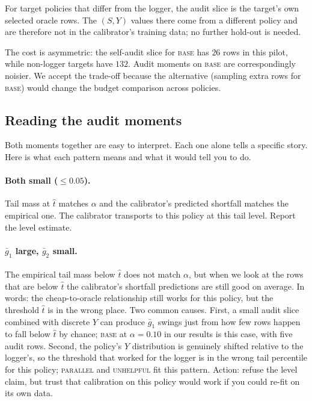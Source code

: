 \documentclass[11pt]{article}
\newcommand{\that}{\widehat{t}}
\begin{document}
For target policies that differ from the logger, the audit slice is
the target's own selected oracle rows. The $(S, Y)$ values there come
from a different policy and are therefore not in the calibrator's
training data; no further hold-out is needed.

The cost is asymmetric: the self-audit slice for \textsc{base} has
$26$ rows in this pilot, while non-logger targets have $132$. Audit
moments on \textsc{base} are correspondingly noisier. We accept the
trade-off because the alternative (sampling extra rows for
\textsc{base}) would change the budget comparison across policies.

\subsection{Reading the audit moments}
\label{app:moments-interp}

Both moments together are easy to interpret. Each one alone tells a
specific story. Here is what each pattern means and what it would tell
you to do.

\paragraph{Both small ($\le 0.05$).} Tail mass at $\that$ matches
$\alpha$ and the calibrator's predicted shortfall matches the
empirical one. The calibrator transports to this policy at this tail
level. Report the level estimate.

\paragraph{$\bar g_1$ large, $\bar g_2$ small.}
The empirical tail mass below $\that$ does not match $\alpha$, but
when we look at the rows that are below $\that$ the calibrator's
shortfall predictions are still good on average. In words: the
cheap-to-oracle relationship still works for this policy, but the
threshold $\that$ is in the wrong place. Two common causes. First, a
small audit slice combined with discrete $Y$ can produce $\bar g_1$
swings just from how few rows happen to fall below $\that$ by chance;
\textsc{base} at $\alpha = 0.10$ in our results is this case, with
five audit rows. Second, the policy's $Y$ distribution is genuinely
shifted relative to the logger's, so the threshold that worked for
the logger is in the wrong tail percentile for this policy;
\textsc{parallel} and \textsc{unhelpful} fit this pattern. Action:
refuse the level claim, but trust that calibration on this policy
would work if you could re-fit on its own data.
\end{document}
